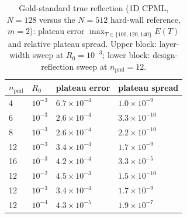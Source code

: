 \begin{table}
\caption{Gold-standard true reflection (1D CPML, $N=128$ versus the
$N=512$ hard-wall reference, $m=2$): plateau error
$\max_{T\in\{100,120,140\}}E(T)$ and relative plateau spread.  Upper
block: layer-width sweep at $R_0=10^{-3}$; lower block: design-reflection
sweep at $n_{\mathrm{pml}}=12$.}
\label{ch3:appD:tab:reflection}
\begin{tabular}{llll}
\toprule
$n_{\mathrm{pml}}$ & $R_0$ & plateau error & plateau spread \\
\midrule
4  & $10^{-3}$ & $6.7\times10^{-4}$ & $1.0\times10^{-9}$ \\
6  & $10^{-3}$ & $2.6\times10^{-4}$ & $3.3\times10^{-10}$ \\
8  & $10^{-3}$ & $2.6\times10^{-4}$ & $2.2\times10^{-10}$ \\
12 & $10^{-3}$ & $3.4\times10^{-4}$ & $1.7\times10^{-9}$ \\
16 & $10^{-3}$ & $4.2\times10^{-4}$ & $3.3\times10^{-5}$ \\
\midrule
12 & $10^{-2}$ & $4.5\times10^{-3}$ & $1.5\times10^{-10}$ \\
12 & $10^{-3}$ & $3.4\times10^{-4}$ & $1.7\times10^{-9}$ \\
12 & $10^{-4}$ & $4.3\times10^{-5}$ & $1.9\times10^{-7}$ \\
\bottomrule
\end{tabular}
\end{table}

